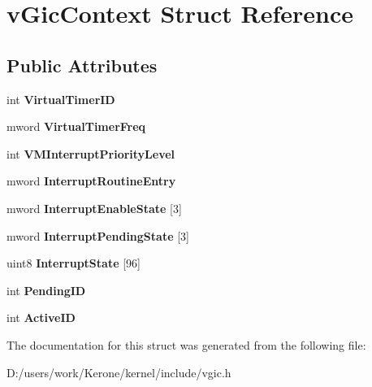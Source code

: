 \section{v\+Gic\+Context Struct Reference}
\label{structv_gic_context}
\subsection*{Public Attributes}
\begin{DoxyCompactItemize}
\item 
\mbox{\label{structv_gic_context_a1e1c9ce2a8bc79e86f7386b3dedf2c01}} 
int {\bfseries Virtual\+Timer\+ID}
\item 
\mbox{\label{structv_gic_context_a3d7452bbf9dc44ae61ffd03f32bff250}} 
mword {\bfseries Virtual\+Timer\+Freq}
\item 
\mbox{\label{structv_gic_context_aee8a6bd3cec47630c5e49c5e61d831f4}} 
int {\bfseries V\+M\+Interrupt\+Priority\+Level}
\item 
\mbox{\label{structv_gic_context_a97544b13b11b583247b961f2bafe0b32}} 
mword {\bfseries Interrupt\+Routine\+Entry}
\item 
\mbox{\label{structv_gic_context_ac993f6d9afadeae71215547f85ef9fe6}} 
mword {\bfseries Interrupt\+Enable\+State} [3]
\item 
\mbox{\label{structv_gic_context_a11d0bce2a1aa7141ea93182b3f1f8b8d}} 
mword {\bfseries Interrupt\+Pending\+State} [3]
\item 
\mbox{\label{structv_gic_context_aba841ea677d9d2c5a3016de21e70ae27}} 
uint8 {\bfseries Interrupt\+State} [96]
\item 
\mbox{\label{structv_gic_context_a956dcbecf5ab4b8ce88ea5840a1a0b42}} 
int {\bfseries Pending\+ID}
\item 
\mbox{\label{structv_gic_context_a4b7b64771215d41e4d6baf27776469ce}} 
int {\bfseries Active\+ID}
\end{DoxyCompactItemize}


The documentation for this struct was generated from the following file\+:\begin{DoxyCompactItemize}
\item 
D\+:/users/work/\+Kerone/kernel/include/vgic.\+h\end{DoxyCompactItemize}
